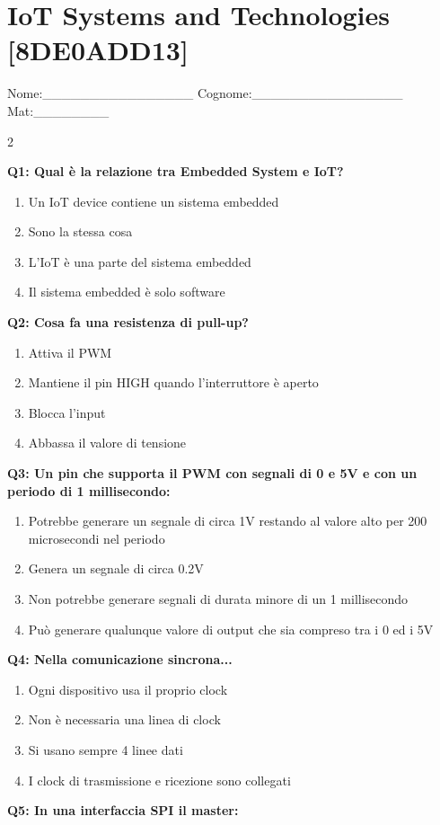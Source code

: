 \documentclass[10pt]{article}
\begin{document}
\newpage

\section*{IoT Systems and Technologies \footnotesize [8DE0ADD13]}
{\footnotesize Nome:\_\_\_\_\_\_\_\_\_\_\_\_\_\_\_\_ Cognome:\_\_\_\_\_\_\_\_\_\_\_\_\_\_\_\_ Mat:\_\_\_\_\_\_\_\_}
\begin{multicols}{2}

\textbf{Q1: Qual è la relazione tra Embedded System e IoT?}

\begin{enumerate}[label=\arabic*.]
\item Un IoT device contiene un sistema embedded
\item Sono la stessa cosa
\item L’IoT è una parte del sistema embedded
\item Il sistema embedded è solo software
\end{enumerate}
\textbf{Q2: Cosa fa una resistenza di pull-up?}

\begin{enumerate}[label=\arabic*.]
\item Attiva il PWM
\item Mantiene il pin HIGH quando l'interruttore è aperto
\item Blocca l’input
\item Abbassa il valore di tensione
\end{enumerate}
\textbf{Q3: Un pin che supporta il PWM con segnali di 0 e 5V e con un periodo di 1 millisecondo:}

\begin{enumerate}[label=\arabic*.]
\item Potrebbe generare un segnale di circa 1V restando al valore alto per 200 microsecondi nel periodo
\item Genera un segnale di circa 0.2V
\item Non potrebbe generare segnali di durata  minore di un 1 millisecondo
\item Può generare qualunque valore di output che sia compreso tra i 0 ed i 5V
\end{enumerate}
\textbf{Q4: Nella comunicazione sincrona...}

\begin{enumerate}[label=\arabic*.]
\item Ogni dispositivo usa il proprio clock
\item Non è necessaria una linea di clock
\item Si usano sempre 4 linee dati
\item I clock di trasmissione e ricezione sono collegati
\end{enumerate}
\textbf{Q5: In una interfaccia SPI il master:}


\end{multicols}
\end{document}
